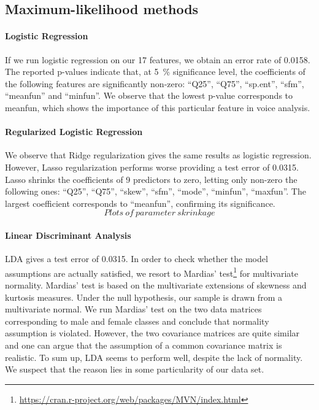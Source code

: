 \subsection{Maximum-likelihood methods}
\paragraph{Logistic Regression}
If we run logistic regression on our \num{17} features, we obtain an error rate of 0.0158. The reported p-values indicate that, at \SI{5}{\percent} significance level, the coefficients of the following features are significantly non-zero: ``Q25'', ``Q75'', ``sp.ent'', ``sfm'', ``meanfun'' and ``minfun''. We observe that the lowest p-value corresponds to meanfun, which shows the importance of this particular feature in voice analysis.

\paragraph{Regularized Logistic Regression}
We observe that Ridge regularization gives the same results as logistic regression. However, Lasso regularization performs worse providing a test error of \num{0.0315}. Lasso shrinks the coefficients of 9 predictors to zero, letting only non-zero the following ones: ``Q25'', ``Q75'', ``skew'', ``sfm'', ``mode'', ``minfun'', ``maxfun''. The largest coefficient corresponds to ``meanfun'', confirming its significance.
$$ Plots ~ of ~ parameter~skrinkage$$ 

\paragraph{Linear Discriminant Analysis}
LDA gives a test error of \num{0.0315}. In order to check whether the model assumptions are actually satisfied, we resort to Mardias' test\footnote{\url{https://cran.r-project.org/web/packages/MVN/index.html}} for multivariate normality. Mardias' test is based on the multivariate extensions of skewness and kurtosis measures. Under the null hypothesis, our sample is drawn from a multivariate normal. 
We run Mardias' test on the two data matrices corresponding to male and female classes and conclude that normality assumption is violated. However, the two covariance matrices are quite similar and one can argue that the assumption of a common covariance matrix is realistic. 
To sum up, LDA seems to perform well, despite the lack of normality. We suspect that the reason lies in some particularity of our data set.


